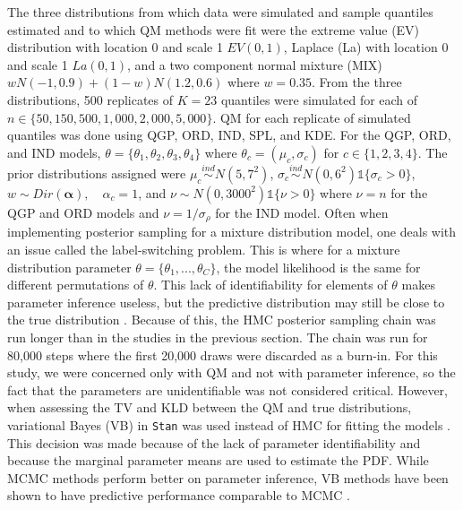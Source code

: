 \documentclass[preprint,12pt,authoryear]{elsarticle}
\newcommand{\1}[1]{\mathds{1}\left[#1\right]}
\begin{document}
The three distributions from which data were simulated and sample quantiles 
estimated and to which QM methods were fit were the extreme value (EV) 
distribution with location 0 and scale 1 $EV(0,1)$, Laplace (La) with location 
0 and scale 1 $La(0,1)$, and a two component normal mixture (MIX) 
$w N(-1, 0.9) + (1-w)N(1.2, 0.6)$ where $w = 0.35$. From the three 
distributions, 500 replicates of $K = 23$ quantiles were simulated for each of 
$n \in \{50, 150, 500, 1{,}000, 2{,}000, 5{,}000\}$. QM for each replicate of 
simulated quantiles was done using QGP, ORD, IND, SPL, and KDE. For the QGP, 
ORD, and IND models, $\theta = \{\theta_1, \theta_2, \theta_3, \theta_4\}$ 
where $\theta_c = (\mu_c, \sigma_c)$ for $c \in \{1,2,3,4\}$. The prior 
distributions assigned were $\mu_c \overset{ind}{\sim} N(5, 7^2)$,
$\sigma_c \overset{ind}{\sim} N(0, 6^2)\mathds{1}\{\sigma_c > 0\}$,
$w \sim Dir(\boldsymbol{\alpha}), \quad \alpha_c = 1$, and
$\nu \sim N(0, 3000^2)\mathds{1}\{\nu > 0\}$
where $\nu = n$ for the QGP and ORD models 
and $\nu = 1/\sigma_{\rho}$ for the IND model. 
Often when implementing posterior sampling for a mixture distribution model, 
one deals with an issue called the label-switching problem. This is where for a
mixture distribution parameter $\theta = \{\theta_1,...,\theta_C\}$, the model 
likelihood is the same for different permutations of $\theta$. This lack of 
identifiability for elements of $\theta$ makes parameter inference useless, 
but the predictive distribution may still be close to the true distribution 
\cite[]{stephens2000dealing}.
Because of this, the HMC posterior sampling chain was run longer than in the 
studies in the previous section. The chain was run for 80,000 steps where the 
first 20,000 draws were discarded as a burn-in. For this study, we were 
concerned only with QM and not with parameter inference, so the fact that the 
parameters are unidentifiable was not considered critical. However, when 
assessing the TV and KLD between the QM and true distributions, variational 
Bayes (VB) in \texttt{Stan} was used instead of HMC for fitting the models 
\cite[]{kucukelbir2015automatic}. This decision was made because of the lack of 
parameter identifiability and because the marginal parameter means are used to 
estimate the PDF. While MCMC methods perform better on parameter inference, 
VB methods have been shown to have predictive performance comparable to MCMC 
\cite[]{blei2017variational}.
\end{document}
